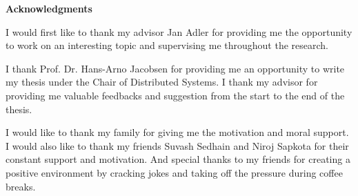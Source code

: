 \clearemptydoublepage
{}
{}	



\vspace*{2cm}

\begin{center}
{\Large \bf Acknowledgments}
\end{center}

\vspace{1cm}

I would first like to thank my advisor Jan Adler for providing me the opportunity to work on an interesting topic and supervising me throughout the research. 
\newline

I thank Prof. Dr. Hans-Arno Jacobsen for providing me an opportunity to write my thesis under the Chair of Distributed Systems. I thank my advisor for providing me valuable feedbacks and suggestion from the start to the end of the thesis.
\newline

I would like to thank my family for giving me the motivation and moral support. I would also like to thank my friends Suvash Sedhain and Niroj Sapkota for their constant support and motivation. And special thanks to my friends for creating a positive environment by cracking jokes and taking off the pressure during coffee breaks.
